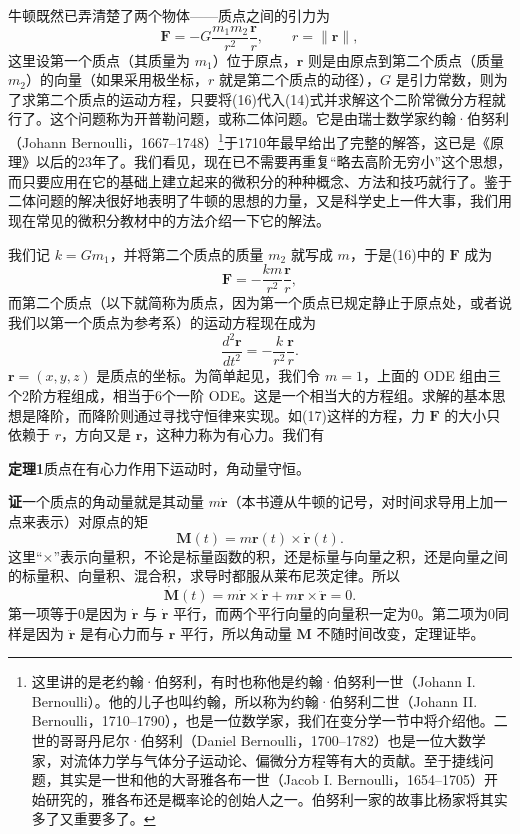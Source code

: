 牛顿既然已弄清楚了两个物体——质点之间的引力为
\begin{equation}
 \boldsymbol F=-G\frac{m_1m_2}{r^2}\frac{\boldsymbol r}{r},\qquad r=\lVert\boldsymbol r\rVert,
 \tag{16}
\end{equation}
这里设第一个质点（其质量为 $m_1$）位于原点，$\boldsymbol r$ 则是由原点到第二个质点（质量 $m_2$）的向量（如果采用极坐标，$r$ 就是第二个质点的动径），$G$ 是引力常数，则为了求第二个质点的运动方程，只要将(16)代入(14)式并求解这个二阶常微分方程就行了。这个问题称为开普勒问题，或称二体问题。它是由瑞士数学家约翰·伯努利（Johann Bernoulli，1667--1748）\footnote{这里讲的是老约翰·伯努利，有时也称他是约翰·伯努利一世（Johann I. Bernoulli）。他的儿子也叫约翰，所以称为约翰·伯努利二世（Johann II. Bernoulli，1710--1790），也是一位数学家，我们在变分学一节中将介绍他。二世的哥哥丹尼尔·伯努利（Daniel Bernoulli，1700--1782）也是一位大数学家，对流体力学与气体分子运动论、偏微分方程等有大的贡献。至于捷线问题，其实是一世和他的大哥雅各布一世（Jacob I. Bernoulli，1654--1705）开始研究的，雅各布还是概率论的创始人之一。伯努利一家的故事比杨家将其实多了又重要多了。}于1710年最早给出了完整的解答，这已是《原理》以后的23年了。我们看见，现在已不需要再重复“略去高阶无穷小”这个思想，而只要应用在它的基础上建立起来的微积分的种种概念、方法和技巧就行了。鉴于二体问题的解决很好地表明了牛顿的思想的力量，又是科学史上一件大事，我们用现在常见的微积分教材中的方法介绍一下它的解法。

我们记 $k=Gm_1$，并将第二个质点的质量 $m_2$ 就写成 $m$，于是(16)中的 $\boldsymbol F$ 成为
\[
 \boldsymbol F=-\frac{km}{r^2}\frac{\boldsymbol r}{r},
\]
而第二个质点（以下就简称为质点，因为第一个质点已规定静止于原点处，或者说我们以第一个质点为参考系）的运动方程现在成为
\begin{equation}
 \frac{d^2\boldsymbol r}{dt^2}=-\frac{k}{r^2}\frac{\boldsymbol r}{r}.
 \tag{17}
\end{equation}
$\boldsymbol r=(x,y,z)$ 是质点的坐标。为简单起见，我们令 $m=1$，上面的 ODE 组由三个2阶方程组成，相当于6个一阶 ODE。这是一个相当大的方程组。求解的基本思想是降阶，而降阶则通过寻找守恒律来实现。如(17)这样的方程，力 $\boldsymbol F$ 的大小只依赖于 $r$，方向又是 $\boldsymbol r$，这种力称为有心力。我们有

\noindent\textbf{定理1}\quad 质点在有心力作用下运动时，角动量守恒。

\noindent\textbf{证}\quad 一个质点的角动量就是其动量 $m\dot{\boldsymbol r}$（本书遵从牛顿的记号，对时间求导用上加一点来表示）对原点的矩
\[
 \boldsymbol M(t)=m\boldsymbol r(t)\times\dot{\boldsymbol r}(t).
\]
这里“$\times$”表示向量积，不论是标量函数的积，还是标量与向量之积，还是向量之间的标量积、向量积、混合积，求导时都服从莱布尼茨定律。所以
\[
 \dot{\boldsymbol M}(t)=m\dot{\boldsymbol r}\times\dot{\boldsymbol r}+m\boldsymbol r\times\ddot{\boldsymbol r}=0.
\]
第一项等于0是因为 $\dot{\boldsymbol r}$ 与 $\dot{\boldsymbol r}$ 平行，而两个平行向量的向量积一定为0。第二项为0同样是因为 $\ddot{\boldsymbol r}$ 是有心力而与 $\boldsymbol r$ 平行，所以角动量 $\boldsymbol M$ 不随时间改变，定理证毕。


